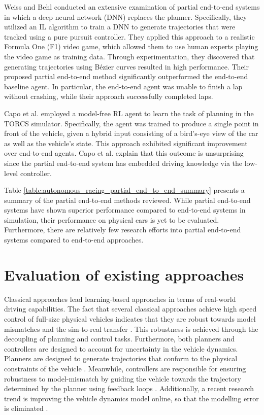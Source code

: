 Weiss and Behl \cite{Weiss2020, Weiss2022} conducted an extensive examination of partial end-to-end systems in which a deep neural network (DNN) replaces the planner. 
Specifically, they utilized an IL algorithm to train a DNN to generate trajectories that were tracked using a pure pursuit controller. 
They applied this approach to a realistic Formula One (F1) video game, which allowed them to use human experts playing the video game as training data.
Through experimentation, they discovered that generating trajectories using B\'ezier curves resulted in high performance. 
Their proposed partial end-to-end method significantly outperformed the end-to-end baseline agent. 
In particular, the end-to-end agent was unable to finish a lap without crashing, while their approach successfully completed laps.

Capo et al. \cite{Capo2020} employed a model-free RL agent to learn the task of planning in the TORCS simulator. 
Specifically, the agent was trained to produce a single point in front of the vehicle, given a hybrid input consisting of a bird's-eye view of the car as well as the vehicle's state. 
This approach exhibited significant improvement over end-to-end agents. 
Capo et al. \cite{Capo2020} explain that this outcome is unsurprising since the partial end-to-end system has embedded driving knowledge via the low-level controller. 

Table \ref{table:autonomous_racing_partial_end_to_end_summary} presents a summary of the partial end-to-end methods reviewed. 
While partial end-to-end systems have shown superior performance compared to end-to-end systems in simulation, their performance on physical cars is yet to be evaluated. 
Furthermore, there are relatively few research efforts into partial end-to-end systems compared to end-to-end approaches.





\section{Evaluation of existing approaches}

Classical approaches lead learning-based approaches in terms of real-world driving capabilities.
The fact that several classical approaches achieve high speed control of full-size physical vehicles indicates that they are robust towards model mismatches and the sim-to-real transfer \cite{Stahl2019,Betz2019}.
This robustness is achieved through the decoupling of planning and control tasks. 
Furthermore, both planners and controllers are designed to account for uncertainty in the vehicle dynamics.
Planners are designed to generate trajectories that conform to the physical constraints of the vehicle \cite{Heilmeier2020, Kelly2010, Stahl2019}. 
Meanwhile, controllers are responsible for ensuring robustness to model-mismatch by guiding the vehicle towards the trajectory determined by the planner using feedback loops \cite{Coulter_1992, Becker2022, Hoffmann2007}.
Additionally, a recent research trend is improving the vehicle dynamics model online, so that the modelling error is eliminated \cite{Tatulea-Codrean2020, Brunner2018a}.

